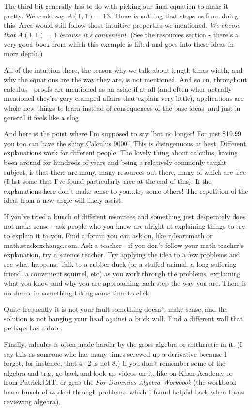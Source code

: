 The third bit generally has to do with picking our final equation to make it pretty. We could say $A(1,1) = 13$. There is nothing that stops us from doing this. Area would still follow those intuitive properties we mentioned. \textit{We choose that $A(1,1) = 1$ because it's convenient.} (See the resources section - there's a very good book from which this example is lifted and goes into these ideas in more depth.)

All of the intuition there, the reason why we talk about length times width, and why the equations are the way they are, is not mentioned. And so on, throughout calculus - proofs are mentioned as an aside  if at all (and often when actually mentioned they're gory cramped affairs that explain very little), applications are whole new things to learn instead of consequences of the base ideas, and just in general it feels like a slog.

And here is the point where I'm supposed to say 'but no longer! For just \$19.99 you too can have the shiny Calculus 9000!' This is disingenuous at best. Different explanations work for different people. The lovely thing about calculus, having been around for hundreds of years and being a relatively commonly taught subject, is that there are many, many resources out there, many of which are free (I list some that I've found particularly nice at the end of this). If the explanations here don't make sense to you...try some others! The repetition of the ideas from a new angle will likely assist. 

If you've tried a bunch of different resources and something just desperately does not make sense - ask people who you know are alright at explaining things to try to explain it to you. Find a forum you can ask on, like r/learnmath or math.stackexchange.com. Ask a teacher - if you don't follow your math teacher's explanation, try a science teacher. Try applying the idea to a few problems and see what happens. Talk to a rubber duck (or a stuffed animal, a long-suffering friend, a convenient squirrel, etc) as you work through the problems, explaining what you know and why you are approaching each step the way you are. There is no shame in something taking some time to click.

Quite frequently it is not your fault something doesn't make sense, and the solution is not banging your head against a brick wall. Find a different wall that perhaps has a door.

Finally, calculus is often made harder by the gross algebra or arithmetic in it. (I say this as someone who has many times screwed up a derivative because I forgot, for instance, that 4+2 is not 8.) If you don't remember some of the algebra and trig, go back and look up videos on it, like on Khan Academy or from PatrickJMT, or grab the \textit{For Dummies Algebra Workbook} (the workbook has a bunch of worked through problems, which I found helpful back when I was reviewing algebra). 